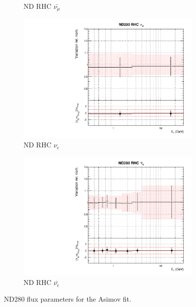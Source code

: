 \begin{figure}[!htbp]
\begin{subfigure}{0.45\textwidth}
  \caption{ND RHC $\bar{\nu_{\mu}}$}
\end{subfigure}
\begin{subfigure}{0.45\textwidth}
  \centering
  \includegraphics[width=0.75\linewidth]{figs/asmvfluxpoly6}
  \caption{ND RHC $\nu_{e}$}
\end{subfigure}
\begin{subfigure}{0.45\textwidth}
  \centering
  \includegraphics[width=0.75\linewidth]{figs/asmvfluxpoly7}
  \caption{ND RHC $\bar{\nu_e}$}
\end{subfigure}
\caption{ND280 flux parameters for the Asimov fit.}
\label{fig:asmvfluxND}
\end{figure}

